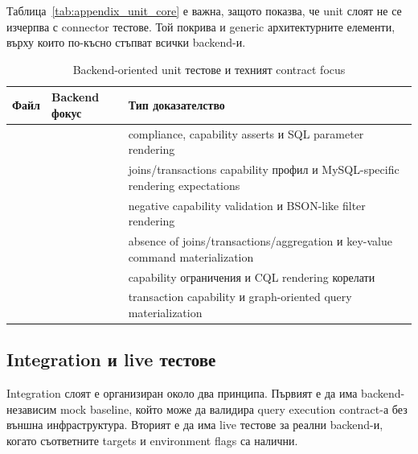 Таблица~\ref{tab:appendix_unit_core} е важна, защото показва, че unit слоят не се изчерпва с connector тестове. Той покрива и generic архитектурните елементи, върху които по-късно стъпват всички backend-и.

\begin{table}[H]
\centering
\small
\caption{Backend-oriented unit тестове и техният contract focus}
\label{tab:appendix_unit_connectors}
\begin{tabularx}{\textwidth}{L{3.4cm}L{3.3cm}Z}
\toprule
\textbf{Файл} & \textbf{Backend фокус} & \textbf{Тип доказателство} \\
\midrule
{} &  &  compliance, capability asserts и SQL parameter rendering \\
 &  & joins/transactions capability профил и MySQL-specific rendering expectations \\
 &  & negative capability validation и BSON-like filter rendering \\
 &  & absence of joins/transactions/aggregation и key-value command materialization \\
 &  & capability ограничения и CQL rendering корелати \\
 &  & transaction capability и graph-oriented query materialization \\
\bottomrule
\end{tabularx}
\end{table}

\subsection{Integration и live тестове}

Integration слоят е организиран около два принципа. Първият е да има backend-независим mock baseline, който може да валидира query execution contract-а без външна инфраструктура. Вторият е да има live тестове за реални backend-и, когато съответните targets и environment flags са налични.

